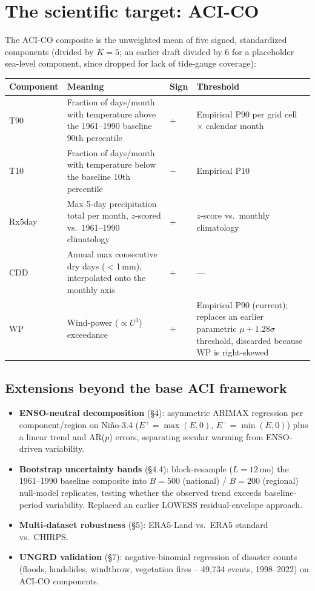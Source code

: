 \documentclass[11pt]{article}
\begin{document}
\section{The scientific target: ACI-CO}

The ACI-CO composite is the unweighted mean of five signed, standardized
components (divided by $K=5$; an earlier draft divided by 6 for a
placeholder sea-level component, since dropped for lack of tide-gauge
coverage):

\begin{longtable}{@{}L{2.2cm}L{6.2cm}L{1.5cm}L{4.5cm}@{}}
\toprule
\textbf{Component} & \textbf{Meaning} & \textbf{Sign} & \textbf{Threshold} \\
\midrule
\endhead
T90 & Fraction of days/month with temperature above the 1961--1990 baseline 90th percentile & $+$ & Empirical P90 per grid cell $\times$ calendar month \\
T10 & Fraction of days/month with temperature below the baseline 10th percentile & $-$ & Empirical P10 \\
Rx5day & Max 5-day precipitation total per month, $z$-scored vs.\ 1961--1990 climatology & $+$ & $z$-score vs.\ monthly climatology \\
CDD & Annual max consecutive dry days ($<$1\,mm), interpolated onto the monthly axis & $+$ & --- \\
WP & Wind-power ($\propto U^3$) exceedance & $+$ & Empirical P90 (current); replaces an earlier parametric $\mu + 1.28\sigma$ threshold, discarded because WP is right-skewed \\
\bottomrule
\end{longtable}

\subsection{Extensions beyond the base ACI framework}

\begin{itemize}[leftmargin=*]
\item \textbf{ENSO-neutral decomposition} (\S4): asymmetric ARIMAX
  regression per component/region on Ni\~no-3.4 ($E^+=\max(E,0)$,
  $E^-=\min(E,0)$) plus a linear trend and AR($p$) errors, separating
  secular warming from ENSO-driven variability.
\item \textbf{Bootstrap uncertainty bands} (\S4.4): block-resample
  ($L=12$\,mo) the 1961--1990 baseline composite into $B=500$ (national) /
  $B=200$ (regional) null-model replicates, testing whether the observed
  trend exceeds baseline-period variability. Replaced an earlier LOWESS
  residual-envelope approach.
\item \textbf{Multi-dataset robustness} (\S5): ERA5-Land vs.\ ERA5 standard
  vs.\ CHIRPS.
\item \textbf{UNGRD validation} (\S7): negative-binomial regression of
  disaster counts (floods, landslides, windthrow, vegetation fires --
  49{,}734 events, 1998--2022) on ACI-CO components.
\end{itemize}
\end{document}

